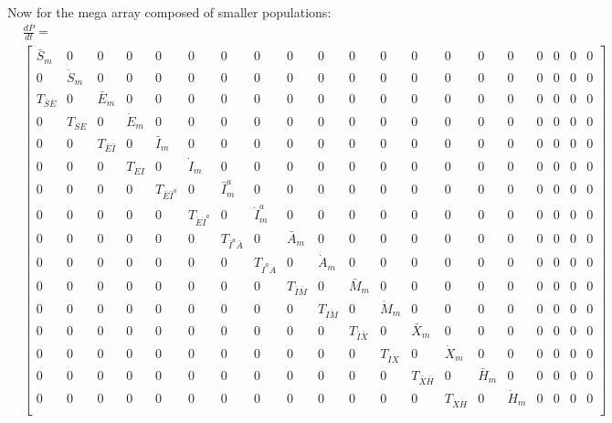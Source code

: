 \documentclass[notitlepage, superscriptaddress]{revtex4-2}
\begin{document}
Now for the mega array composed of smaller populations:
\begin{eqnarray}
&\frac{dP}{dt} = \nonumber \\
&\begin{bmatrix}
\bar{S}_{m} & 0 & 0 & 0 & 0 & 0 & 0 & 0 & 0 & 0 & 0 & 0 & 0 & 0 & 0 & 0 & 0 & 0 & 0 & 0 \\ 
0 & \dot{S}_{m} & 0 & 0 & 0 & 0 & 0 & 0 & 0 & 0 & 0 & 0 & 0 & 0 & 0 & 0 & 0 & 0 & 0 & 0 \\ 
T_{\bar{S}\bar{E}} & 0 & \bar{E}_{m} & 0 & 0 & 0 & 0 & 0 & 0 & 0 & 0 & 0 & 0 & 0 & 0 & 0 & 0 & 0 & 0 & 0 \\ 
0 & T_{\dot{S}\dot{E}} & 0 & \dot{E}_{m} & 0 & 0 & 0 & 0 & 0 & 0 & 0 & 0 & 0 & 0 & 0 & 0 & 0 & 0 & 0 & 0 \\ 
0 & 0 & T_{\bar{E}\bar{I}} & 0 & \bar{I}_{m} & 0 & 0 & 0 & 0 & 0 & 0 & 0 & 0 & 0 & 0 & 0 & 0 & 0 & 0 & 0 \\ 
0 & 0 & 0 & T_{\dot{E}\dot{I}} & 0 & \dot{I}_{m} & 0 & 0 & 0 & 0 & 0 & 0 & 0 & 0 & 0 & 0 & 0 & 0 & 0 & 0 \\ 
0 & 0 & 0 & 0 & T_{\bar{E}\bar{I}^{a}} & 0 & \bar{I}^{a}_{m} & 0 & 0 & 0 & 0 & 0 & 0 & 0 & 0 & 0 & 0 & 0 & 0 & 0 \\ 
0 & 0 & 0 & 0 & 0 & T_{\dot{E}\dot{I}^{a}} & 0 & \dot{I}^{a}_{m} & 0 & 0 & 0 & 0 & 0 & 0 & 0 & 0 & 0 & 0 & 0 & 0 \\ 
0 & 0 & 0 & 0 & 0 & 0 & T_{\bar{I}^{a}\bar{A}} & 0 & \bar{A}_{m} & 0 & 0 & 0 & 0 & 0 & 0 & 0 & 0 & 0 & 0 & 0 \\ 
0 & 0 & 0 & 0 & 0 & 0 & 0 & T_{\dot{I}^{a}\dot{A}} & 0 & \dot{A}_{m} & 0 & 0 & 0 & 0 & 0 & 0 & 0 & 0 & 0 & 0 \\ 
0 & 0 & 0 & 0 & 0 & 0 & 0 & 0 & T_{\bar{I}\bar{M}} & 0 & \bar{M}_{m} & 0 & 0 & 0 & 0 & 0 & 0 & 0 & 0 & 0 \\ 
0 & 0 & 0 & 0 & 0 & 0 & 0 & 0 & 0 & T_{\dot{I}\dot{M}} & 0 & \dot{M}_{m} & 0 & 0 & 0 & 0 & 0 & 0 & 0 & 0 \\ 
0 & 0 & 0 & 0 & 0 & 0 & 0 & 0 & 0 & 0 & T_{\bar{I}\bar{X}} & 0 & \bar{X}_{m} & 0 & 0 & 0 & 0 & 0 & 0 & 0 \\ 
0 & 0 & 0 & 0 & 0 & 0 & 0 & 0 & 0 & 0 & 0 & T_{\dot{I}\dot{X}} & 0 & \dot{X}_{m} & 0 & 0 & 0 & 0 & 0 & 0 \\ 
0 & 0 & 0 & 0 & 0 & 0 & 0 & 0 & 0 & 0 & 0 & 0 & T_{\bar{X}\bar{H}} & 0 & \bar{H}_{m} & 0 & 0 & 0 & 0 & 0 \\ 
0 & 0 & 0 & 0 & 0 & 0 & 0 & 0 & 0 & 0 & 0 & 0 & 0 & T_{\dot{X}\dot{H}} & 0 & \dot{H}_{m} & 0 & 0 & 0 & 0 \\ 

\end{bmatrix}
\end{eqnarray}
\end{document}
